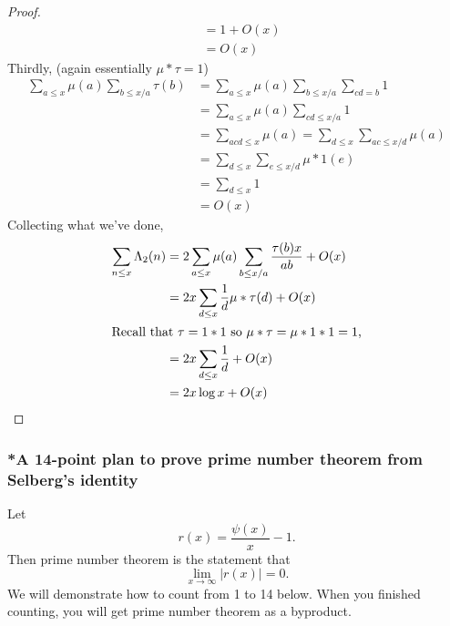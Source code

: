 \documentclass[a4paper]{article}
\begin{document}
\begin{proof}
\begin{align*}
    &= 1 + O(x) \\
    &= O(x)
  \end{align*}
  Thirdly, (again essentially \(\mu * \tau = 1\))
  \begin{align*}
    \sum_{a \leq x} \mu(a) \sum_{b \leq x/a} \tau(b)
    &= \sum_{a \leq x} \mu(a) \sum_{b \leq x/a}\sum_{cd = b} 1 \\
    &= \sum_{a \leq x} \mu(a) \sum_{cd \leq x/a} 1 \\
    &= \sum_{acd \leq x} \mu(a)
    = \sum_{d \leq x} \sum_{ac \leq x/d} \mu(a) \\
    &= \sum_{d \leq x} \sum_{e \leq x/d} \mu * 1(e) \\
    &= \sum_{d \leq x} 1 \\
    &= O(x)
  \end{align*}
  Collecting what we've done,
  \begin{align*}
    \sum_{n \leq x} \Lambda_2(n)
    &= 2 \sum_{a \leq x} \mu(a) \sum_{b \leq x/a} \frac{\tau(b) x}{ab} + O(x) \\
    &= 2x \sum_{d \leq x} \frac{1}{d} \mu * \tau(d) + O(x) \\
    \intertext{Recall that \(\tau = 1 * 1\) so \(\mu * \tau = \mu * 1 * 1 = 1\),}
    &= 2x \sum_{d \leq x} \frac{1}{d} + O(x) \\
    &= 2x \log x + O(x)
  \end{align*}
\end{proof}

\subsubsection{*A 14-point plan to prove prime number theorem from Selberg's identity}

Let
\[
  r(x) = \frac{\psi(x)}{x} - 1.
\]
Then prime number theorem is the statement that
\[
  \lim_{x \to \infty} |r(x)| = 0.
\]
We will demonstrate how to count from 1 to 14 below. When you finished counting, you will get prime number theorem as a byproduct.
\end{document}
